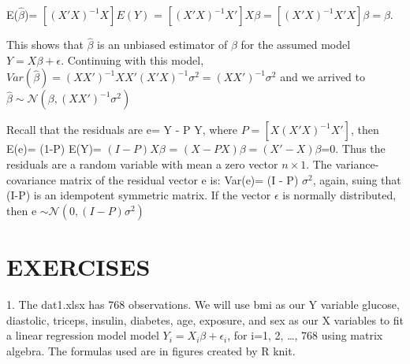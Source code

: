 \documentclass[letterpaper,11pt]{article}
\begin{document}
E($\hat{\beta}$)= $[(X'X)^{-1} X] E(Y)$ = $[(X'X)^{-1} X']X \beta= [(X'X)^{-1} X'X] \beta= \beta$.

This shows that $\hat{\beta}$ is an unbiased estimator of $\beta$ for the assumed model $Y = X \beta + \epsilon$.
Continuing with this model, $Var(\hat{\beta})=(X X')^{-1} X X' (X' X)^{-1} \sigma^{2}= (X X')^{-1} \sigma^{2}$
and we arrived to $\hat{\beta} \sim \mathcal{N}(\beta, (X X')^{-1} \sigma^{2})$

Recall that the residuals are e= Y - P Y, where $P= [X (X' X)^{-1} X']$, then E(e)= (1-P) E(Y)= $(I-P) X \beta$ = $(X- PX) \beta= (X' - X) \beta$=0. Thus the residuals are a random variable with mean a zero vector $n \times 1$.
The variance-covariance matrix of the residual vector e is:
Var(e)= (I - P) $\sigma^{2}$, again, suing that (I-P) is an idempotent symmetric matrix. If the vector $\epsilon$ is normally distributed, then e $\sim \mathcal{N}(0, (I-P) \sigma^{2})$


\section{EXERCISES}

1. The dat1.xlsx has 768 observations. We will use bmi as our Y variable glucose, diastolic, triceps, insulin, diabetes, age, exposure, and sex as our X variables to fit a linear regression model model $Y_{i} = X_{i} \beta + \epsilon_{i}$, for i=1, 2, \ldots, 768 using matrix algebra. The formulas used are in figures created by R knit.
\\ \\
\end{document}

